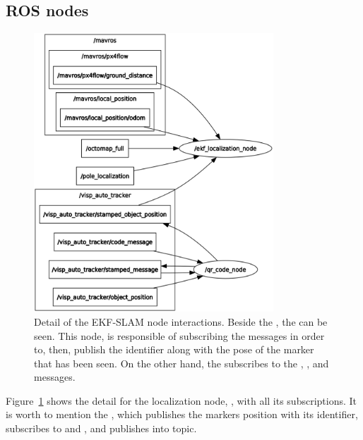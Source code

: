 \subsection{ROS nodes}
\label{subsec:chapter2:arch:nodes}
\begin{figure}[h]
    \centering
    \includegraphics[width=0.8\textwidth]{Images/fig12-rosgraph_ekf_node}
    \caption[Detail of the EKF-SLAM node interactions]{Detail of the EKF-SLAM node interactions. Beside the , the  can be seen. This node, is responsible of subscribing the  messages in order to, then, publish the identifier along with the pose of the marker that has been seen. On the other hand, the  subscribes to the , ,  and  messages.}
    \label{fig:chapter2:architecture:nodes:ekf_node}
\end{figure}

Figure~\ref{fig:chapter2:architecture:nodes:ekf_node} shows the detail for the localization node, , with all its subscriptions. It is worth to mention the , which publishes the markers position with its identifier, subscribes to  and , and publishes into  topic.\\


